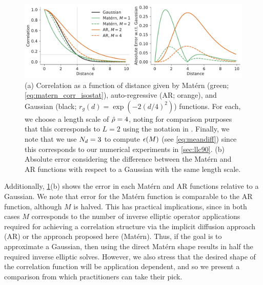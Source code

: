 \begin{figure}
    \centering
    \includegraphics[width=\textwidth]{../figures/correlation_comparison.pdf}
    \caption{(a) Correlation as a function of distance given by
        Mat\'ern (green; \cref{eq:matern_corr_isostat}),
        auto-regressive (AR; orange),
        and Gaussian (black; $r_g(d) = \exp(-2 (d/4)^2)$) functions.
        For each, we choose a length scale of $\hat{\rho} = 4$, noting for
        comparison purposes that this corresponds to $L=2$ using the notation in
        \citet{mirouze_representation_2010}.
        Finally, we note that we use $N_{d} = 3$ to compute $\epsilon(M)$ (see
        \cref{eq:meandiff}) since this corresponds to our numerical experiments
        in \cref{sec:llc90}.
        (b) Absolute error considering the difference between the Mat\'ern and
        AR functions with respect to a Gaussian with the same length scale.
    }
    \label{fig:correlation_comparison}
\end{figure}

Additionally, \cref{fig:correlation_comparison}(b) shows the error in each
Mat\'ern and AR functions relative to a Gaussian.
We note that error for the Mat\'ern function is comparable to the AR function,
although $M$ is halved.
This has practical implications, since in both cases $M$ corresponds to the
number of inverse elliptic operator applications required for achieving a
correlation structure via the implicit diffusion approach (AR) or the approach
proposed here (Mat\'ern).
Thus, if the goal is to approximate a Gaussian, then using the direct Mat\'ern
shape results in half the required inverse elliptic solves.
However, we also stress that the desired shape of the correlation function will
be application dependent, and so we present a comparison from which
practitioners can take their pick.
